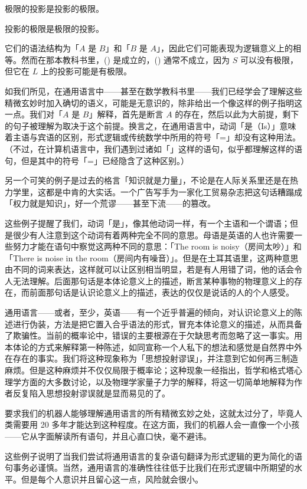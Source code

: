 \startitemize[R]
\item 极限的投影是投影的极限。
\item 投影的极限是极限的投影。
\stopitemize

它们的语法结构为「$A$ 是 $B$」和「$B$ 是 $A$」，因此它们可能表现为逻辑意义上的相等。然而在那本教科书里，() 是成立的，() 通常不成立，因为 $S$ 可以没有极限，但它在 $L$ 上的投影可能是有极限。

如我们所见，在通用语言中——甚至在数学教科书里——我们已经学会了理解这些精微玄妙时加入确切的语义，可能是无意识的，除非给出一个像这样的例子指明这一点。我们对「$A$ 是 $B$」解释，首先是断言 $A$ 的存在，然后以此为大前提，剩下的句子被理解为取决于这个前提。换言之，在通用语言中，动词「是（Is）」意味着主语与宾语的区别，形式逻辑或传统数学中所用的符号「=」却没有这种用法。（不过，在计算机语言中，我们遇到过诸如「」这样的语句，似乎都理解这样的语句，但是其中的符号「=」已经隐含了这种区别。）

另一个可笑的例子是过去的格言「知识就是力量」，不论是在人际关系里还是在热力学里，这都是中肯的大实话。一个广告写手为一家化工贸易杂志把这句话糟蹋成「权力就是知识」，好一个荒谬——甚至下流——的篡改。

这些例子提醒了我们，动词「是」，像其他动词一样，有一个主语和一个谓语；但是很少有人注意到这个动词有着两种完全不同的意思。母语是英语的人也许需要一些努力才能在语句中察觉这两种不同的意思：「The room is noisy（房间太吵）」和「There is noise in the room（房间内有噪音）」。但是在土耳其语里，这两种意思由不同的词来表达，这样就可以让区别相当明显，若是有人用错了词，他的话会令人无法理解。后面那句话是本体论意义上的描述，断言某种事物的物理意义上的存在，而前面那句话是认识论意义上的描述，表达的仅仅是说话的人的个人感受。

通用语言——或者，至少，英语——有一个近乎普遍的倾向，对认识论意义上的陈述进行伪装，方法是把它置入合乎语法的形式，冒充本体论意义的描述，从而具备了欺骗性。当前的概率论中，错误的主要根源在于欠缺思考而忽略了这一事实。用本体论的方式来解释第一种陈述，如同宣称一个人私下的想法和感觉是自然界中外在存在的事实。我们将这种现象称为「思想投射谬误」，并注意到它如何再三制造麻烦。但是这种麻烦并不仅仅局限于概率论；这种现象一经指出，哲学和格式塔心理学方面的大多数讨论，以及物理学家量子力学的解释，将这一切简单地解释为作者反复陷入思想投射谬误就是显而易见的了。

要求我们的机器人能够理解通用语言的所有精微玄妙之处，这就太过分了，毕竟人类需要用 20 多年才能达到这种程度。在这方面，我们的机器人会一直像一个小孩——它从字面解读所有语句，并且心直口快，毫不避讳。

这些例子说明了当我们尝试将通用语言的复杂语句翻译为形式逻辑的更为简化的语句事务必谨慎。当然，通用语言的准确性往往低于比我们在形式逻辑中所期望的水平。但是每个人意识并且留心这一点，风险就会很小。

